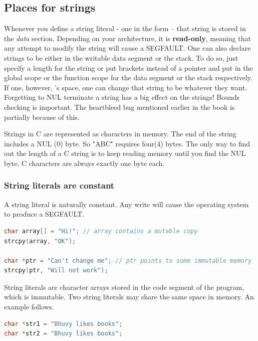 \subsection{Places for strings}

Whenever you define a string literal - one in the form  -- that string is stored in the \emph{data} section. Depending on your architecture, it is \textbf{read-only}, meaning that any attempt to modify the string will cause a SEGFAULT.
One can also declare strings to be either in the writable data segment or the stack. To do so, just specify a length for the string or put brackets instead of a pointer  and put in the global scope or the function scope for the data segment or the stack respectively.
If one, however, 's space, one can change that string to be whatever they want.
Forgetting to NUL terminate a string has a big effect on the strings! Bounds checking is important.
The heartbleed bug mentioned earlier in the book is partially because of this.

Strings in C are represented as characters in memory.
The end of the string includes a NUL (0) byte.
So "ABC" requires four(4) bytes.
The only way to find out the length of a C string is to keep reading memory until you find the NUL byte.
C characters are always exactly one byte each.

\subsubsection{String literals are constant}

A string literal is naturally constant.
Any write will cause the operating system to produce a SEGFAULT. 

\begin{lstlisting}[language=C]
char array[] = "Hi!"; // array contains a mutable copy
strcpy(array, "OK");

char *ptr = "Can't change me"; // ptr points to some immutable memory
strcpy(ptr, "Will not work");
\end{lstlisting}

String literals are character arrays stored in the code segment of the program, which is immutable.
Two string literals may share the same space in memory.
An example follows.

\begin{lstlisting}[language=C]
char *str1 = "Bhuvy likes books";
char *str2 = "Bhuvy likes books";
\end{lstlisting}

